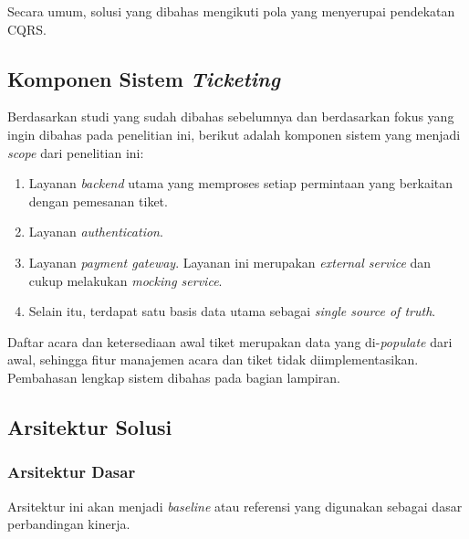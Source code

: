 Secara umum, solusi yang dibahas mengikuti pola yang menyerupai pendekatan CQRS.

\subsection{Komponen Sistem \textit{Ticketing}}

Berdasarkan studi yang sudah dibahas sebelumnya dan berdasarkan fokus yang ingin dibahas pada penelitian ini, berikut adalah komponen sistem yang menjadi \textit{scope} dari penelitian ini:

\begin{enumerate}
  \item Layanan \textit{backend} utama yang memproses setiap permintaan yang berkaitan dengan pemesanan tiket.
  \item Layanan \textit{authentication}.
  \item Layanan \textit{payment gateway}. Layanan ini merupakan \textit{external service} dan cukup melakukan \textit{mocking service}.
  \item Selain itu, terdapat satu basis data utama sebagai \textit{single source of truth}.
\end{enumerate}

Daftar acara dan ketersediaan awal tiket merupakan data yang di-\textit{populate} dari awal, sehingga fitur manajemen acara dan tiket tidak diimplementasikan. Pembahasan lengkap sistem dibahas pada bagian lampiran.

\subsection{Arsitektur Solusi}

\subsubsection{Arsitektur Dasar}

Arsitektur ini akan menjadi \textit{baseline} atau referensi yang digunakan sebagai dasar perbandingan kinerja.


